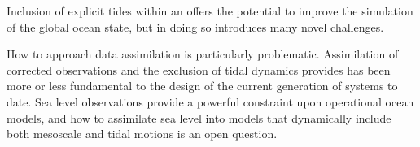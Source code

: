 Inclusion of explicit tides within an \OGCM{}  offers the potential to improve the simulation of the global ocean state, but in doing so introduces many novel challenges.

How to approach data assimilation is particularly problematic.  Assimilation of corrected observations and the exclusion of tidal dynamics provides has been more or less fundamental to the design of the current generation of \GODAE{} systems to date.
Sea level observations provide a powerful constraint upon operational ocean models, and how to assimilate sea level into models that dynamically include both mesoscale and tidal motions is an open question.   
